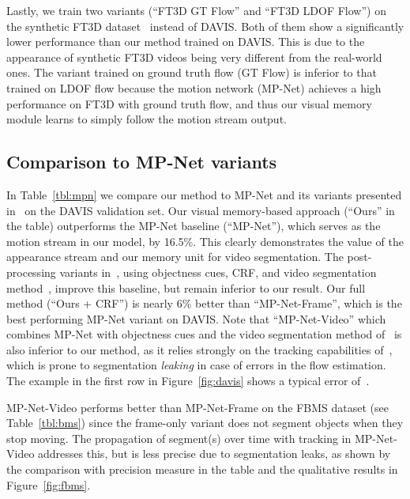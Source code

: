 \documentclass[10pt,twocolumn,letterpaper]{article}
\begin{document}
Lastly, we train two variants (``FT3D GT Flow'' and ``FT3D LDOF Flow'') on the
synthetic FT3D dataset~\cite{Mayer16} instead of DAVIS. Both of them show a
significantly lower performance than our method trained on DAVIS. This is due
to the appearance of synthetic FT3D videos being very different from the
real-world ones. The variant trained on ground truth flow (GT Flow) is inferior
to that trained on LDOF flow because the motion network (MP-Net) achieves a
high performance on FT3D with ground truth flow, and thus our visual memory
module learns to simply follow the motion stream output.

\subsection{Comparison to MP-Net variants}
\label{sec:mpc}
In Table~\ref{tbl:mpn} we compare our method to MP-Net and its variants
presented in~\cite{tokmakov2016learning} on the DAVIS validation set.  Our
visual memory-based approach (``Ours'' in the table) outperforms the MP-Net
baseline (``MP-Net''), which serves as the motion stream in our model, by
16.5\%. This clearly demonstrates the value of the appearance stream and our
memory unit for video segmentation. The post-processing variants
in~\cite{tokmakov2016learning}, using objectness cues, CRF, and video
segmentation method~\cite{papazoglou2013fast}, improve this baseline, but
remain inferior to our result. Our full method (``Ours + CRF'') is nearly 6\%
better than ``MP-Net-Frame'', which is the best performing MP-Net variant
on DAVIS. 
Note that ``MP-Net-Video'' which combines MP-Net with
objectness cues and the video segmentation method of~\cite{papazoglou2013fast}
is also inferior to our method, as it relies strongly on the tracking
capabilities of~\cite{papazoglou2013fast}, which is prone to segmentation {\it
leaking} in case of errors in the flow estimation. The example in the first row in
Figure~\ref{fig:davis} shows a typical error of~\cite{papazoglou2013fast}.

MP-Net-Video performs better than MP-Net-Frame on the FBMS dataset (see
Table~\ref{tbl:bms}) since the frame-only variant does not segment objects when
they stop moving. The propagation of segment(s) over time with tracking in
MP-Net-Video addresses this, but is less precise due to segmentation leaks, as
shown by the comparison with precision measure in the table and the qualitative
results in Figure~\ref{fig:fbms}.
\end{document}
